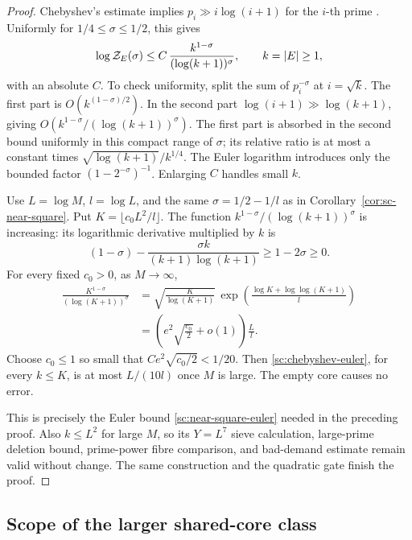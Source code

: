 \begin{proof}
Chebyshev's estimate implies \(p_i\gg i\log(i+1)\) for the
\(i\)-th prime \cite{GranvilleSound}. Uniformly for
\(1/4\le\sigma\le1/2\), this gives
\begin{equation}
 \log{\cal Z}_E(\sigma)
 \le C\,\frac{k^{1-\sigma}}{(\log(k+1))^\sigma},
 \qquad k=|E|\ge1,
 \label{sc:chebyshev-euler}
\end{equation}
with an absolute \(C\). To check uniformity, split the sum of
\(p_i^{-\sigma}\) at \(i=\sqrt k\). The first part is
\(O(k^{(1-\sigma)/2})\). In the second part
\(\log(i+1)\gg\log(k+1)\), giving
\(O(k^{1-\sigma}/(\log(k+1))^\sigma)\).
The first part is absorbed in the second bound uniformly in
this compact range of \(\sigma\); its relative ratio is at most
a constant times \(\sqrt{\log(k+1)}/k^{1/4}\).
The Euler logarithm introduces only the bounded factor
\((1-2^{-\sigma})^{-1}\). Enlarging \(C\) handles small \(k\).

Use \(L=\log M\), \(l=\log L\), and the same
\(\sigma=1/2-1/l\) as in Corollary~\ref{cor:sc-near-square}.
Put \(K=\lfloor c_0L^2/l\rfloor\).
The function \(k^{1-\sigma}/(\log(k+1))^\sigma\) is increasing:
its logarithmic derivative multiplied by \(k\) is
\[
 (1-\sigma)-
 \frac{\sigma k}{(k+1)\log(k+1)}
 \ge1-2\sigma\ge0.
\]
For every fixed \(c_0>0\), as \(M\to\infty\),
\[
 \begin{split}
 \frac{K^{1-\sigma}}{(\log(K+1))^\sigma}
 &=\sqrt{\frac K{\log(K+1)}}\,
   \exp\left(\frac{\log K+\log\log(K+1)}l\right)\\
 &=\left(e^2\sqrt{\frac{c_0}{2}}+o(1)\right)\frac L l.
 \end{split}
\]
Choose \(c_0\le1\) so small that
\(Ce^2\sqrt{c_0/2}<1/20\). Then
\eqref{sc:chebyshev-euler}, for every \(k\le K\), is at most
\(L/(10l)\) once \(M\) is large.
The empty core causes no error.

This is precisely the Euler bound
\eqref{sc:near-square-euler} needed in the preceding proof.
Also \(k\le L^2\) for large \(M\), so its \(Y=L^7\)
sieve calculation, large-prime deletion bound, prime-power fibre
comparison, and bad-demand estimate remain valid without change.
The same construction and the quadratic gate finish the proof.
\end{proof}

\subsection{Scope of the larger shared-core class}

